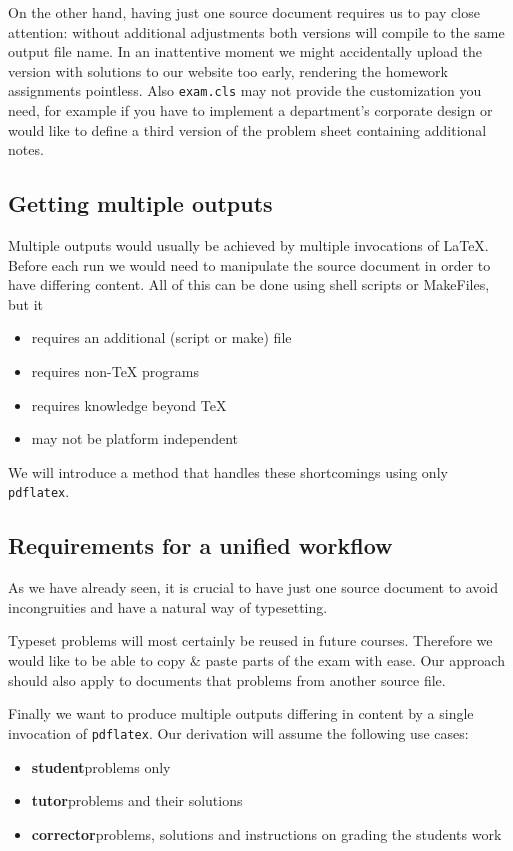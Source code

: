 \documentclass{maps}
\begin{document}
On the other hand, having just one source document requires us to pay close attention: without additional adjustments both versions will compile to the same output file name. In an inattentive moment we might accidentally upload the version with solutions to our website too early, rendering the homework assignments pointless. Also \texttt{exam.cls} may not provide the customization you need, for example if you have to implement a department's corporate design or would like to define a third version of the problem sheet containing additional notes.

\subsection{Getting multiple outputs}

Multiple outputs would usually be achieved by multiple invocations of \LaTeX{}. Before each run we would need to manipulate the source document in order to have differing content. All of this can be done using shell scripts or MakeFiles, but it
\begin{itemize}
\item requires an additional (script or make) file
\item requires non-\TeX{} programs
\item requires knowledge beyond \TeX{}
\item may not be platform independent
\end{itemize}
We will introduce a method that handles these shortcomings using only \texttt{pdflatex}.

\subsection{Requirements for a unified workflow}
As we have already seen, it is crucial to have just one source document to avoid incongruities and have a natural way of typesetting.

Typeset problems will most certainly be reused in future courses. Therefore we would like to be able to copy \& paste parts of the exam with ease. Our approach should also apply to documents that \verb++ problems from another source file.

Finally we want to produce multiple outputs differing in content by a single invocation of \texttt{pdflatex}. Our derivation will assume the following use cases:
\begin{itemize}
\item \textbf{student}\quad problems only
\item \textbf{tutor}\quad problems and their solutions
\item \textbf{corrector}\quad problems, solutions and instructions on grading the students work
\end{itemize}
\end{document}
